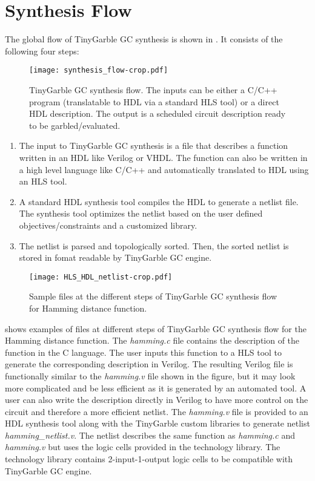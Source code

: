 \section{Synthesis Flow}
The global flow of TinyGarble GC synthesis is shown in .
It consists of the following four steps:

\begin{figure}[ht]
\centering
\texttt{[image: synthesis\_flow-crop.pdf]}
\caption{TinyGarble GC synthesis flow.
  The inputs can be either a C/C++ program (translatable to HDL via a standard HLS tool) or a direct HDL description.
  The output is a scheduled circuit description ready to be garbled/evaluated.}
\label{fig:synthesis-flow}
\end{figure}

\begin{enumerate}
\item
  The input to TinyGarble GC synthesis is a file that describes a function written in an HDL like Verilog or VHDL.
  The function can also be written in a high level language like C/C++ and automatically translated to HDL using an HLS tool.

\item
  A standard HDL synthesis tool compiles the HDL to generate a netlist file.
  The synthesis tool optimizes the netlist based on the user defined objectives/constraints and a customized library.

\item
  The netlist is parsed and topologically sorted.
  Then, the sorted netlist is stored in fomat readable by TinyGarble GC engine.

\end{enumerate}

\begin{figure}[ht]
\centering
\texttt{[image: HLS\_HDL\_netlist-crop.pdf]}
\caption{Sample files at the different steps of TinyGarble GC synthesis flow for Hamming distance function.}
\label{fig:globalflow_sample}
\end{figure}

 shows examples of files at different steps of TinyGarble GC synthesis flow for the Hamming distance function.
The \textsl{hamming.c} file contains the description of the function in the C language.
The user inputs this function to a HLS tool to generate the corresponding description in Verilog.
The resulting Verilog file is functionally similar to the \textsl{hamming.v} file shown in the figure, but it may look more complicated and be less efficient as it is generated by an automated tool.
A user can also write the description directly in Verilog to have more control on the circuit and therefore a more efficient netlist.
The \textsl{hamming.v} file is provided to an HDL synthesis tool along with the TinyGarble custom libraries to generate netlist \textsl{hamming\_netlist.v}.
The netlist describes the same function as \textsl{hamming.c} and \textsl{hamming.v} but uses the logic cells provided in the technology library.
The technology library contains 2-input-1-output logic cells to be compatible with TinyGarble GC engine.

